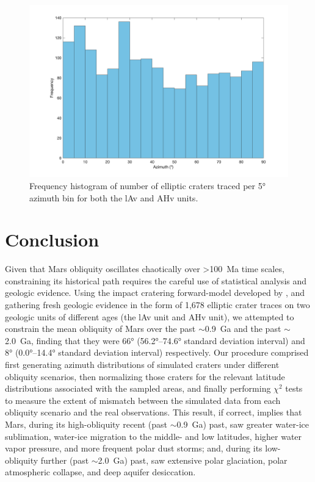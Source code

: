 \documentclass{ucetd}
\begin{document}
\begin{figure}
    \includegraphics[width=\textwidth]{figures/fig4_4.png}
    \caption[Azimuth frequency histogram of traced craters]{Frequency histogram of number of elliptic craters traced per 5° azimuth bin for both the lAv and AHv units.}
    \label{fig:4-4}
\end{figure}

\chapter{Conclusion}
\label{chapter:5}

Given that Mars obliquity oscillates chaotically over >100~Ma time scales, constraining its historical path requires the careful use of statistical analysis and geologic evidence. Using the impact cratering forward-model developed by \citet{holo2018a}, and gathering fresh geologic evidence in the form of 1,678 elliptic crater traces on two geologic units of different ages (the lAv unit and AHv unit), we attempted to constrain the mean obliquity of Mars over the past $\sim$0.9~Ga and the past $\sim$2.0~Ga, finding that they were 66° (56.2°--74.6° standard deviation interval) and 8° (0.0°--14.4° standard deviation interval) respectively. Our procedure comprised first generating azimuth distributions of simulated craters under different obliquity scenarios, then normalizing those craters for the relevant latitude distributions associated with the sampled areas, and finally performing $\chi^2$ tests to measure the extent of mismatch between the simulated data from each obliquity scenario and the real observations. This result, if correct, implies that Mars, during its high-obliquity recent (past $\sim$0.9~Ga) past, saw greater water-ice sublimation, water-ice migration to the middle- and low latitudes, higher water vapor pressure, and more frequent polar dust storms; and, during its low-obliquity further (past $\sim$2.0~Ga) past, saw extensive polar glaciation, polar atmospheric collapse, and deep aquifer desiccation.
\end{document}
